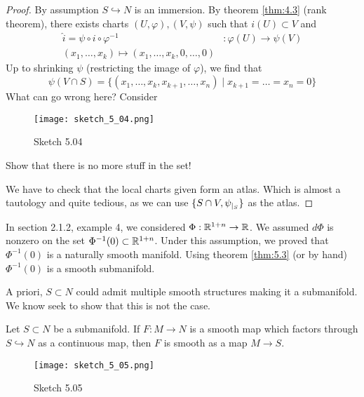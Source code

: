 \begin{proof}
     By assumption \(S\hookrightarrow N\) is an immersion. 
    By theorem \ref{thm:4.3} (rank theorem), there exists charts \((U,\varphi),(V,\psi)\) such that \(i(U)\subset V\)
    and 
    \begin{align*}
        \hat{i}=\psi\circ i\circ \varphi^{-1}&:\varphi(U)\to\psi(V)\\
        (x_1,\dots,x_k)\mapsto (x_1,\dots,x_k,0,\dots,0)
    \end{align*}
    Up to shrinking \(\psi\) (restricting the image of \(\varphi\)), we find that 
    \[\psi(V\cap S)=\{(x_1,\dots,x_k,x_{k+1},\dots,x_n)\mid x_{k+1}=\dots=x_{n}=0\}\]
     What can go wrong here? Consider 
    \begin{figure}[H]\label{fig:5.04}
        \centering
        \texttt{[image: sketch\_5\_04.png]}
        \caption{Sketch 5.04}
    \end{figure}
    Show that there is no more stuff in the set! %

     We have to check that the local charts given form an atlas. Which is almost a tautology and quite tedious, as we can use \(\{S\cap V,\psi_{|_{S}}\}\) as the atlas.
\end{proof}

\begin{remark}[+Exercise]
    In section 2.1.2, example 4, we considered %
    \(\Phi:\mathbb{R}^{1+n}\to\mathbb{R}\). We assumed \(d\Phi\) is nonzero on 
    the set \(\Phi^{-1}(0)\subset\mathbb{R}^{1+n}\). Under this assumption, we proved 
    that \(\Phi^{-1}(0)\) is a naturally smooth manifold. Using theorem \ref{thm:5.3} (or by hand) 
    \(\Phi^{-1}(0)\) is a smooth submanifold.
\end{remark}

A priori, \(S\subset N\) could admit multiple smooth structures making it a submanifold. We know 
    seek to show that this is not the case.

\begin{lemma}\label{lem:5.4}
    Let \(S\subset N\) be a submanifold. If \(F:M\to N\) is a smooth map which factors through 
    \(S\hookrightarrow N\) as a continuous map, then \(F\) is smooth as a map \(M\to S\). 
    \begin{figure}[H]\label{fig:5.05}
        \centering
        \texttt{[image: sketch\_5\_05.png]}
        \caption{Sketch 5.05}
    \end{figure}
\end{lemma}

